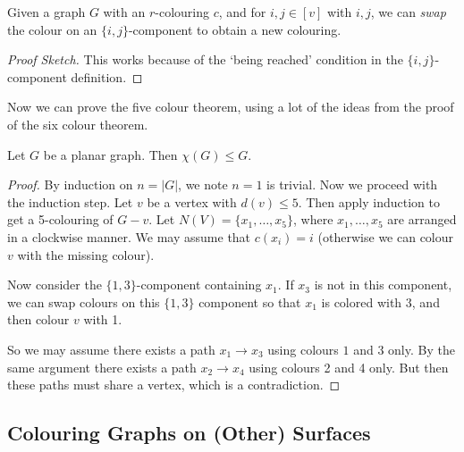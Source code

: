 \documentclass[a4paper]{scrartcl}
\begin{document}
\begin{proposition}
Given a graph $G$ with an $r$-colouring $c$, and for $i, j \in [v]$ with $i, j$, we can \emph{swap} the colour on an $\{i, j\}$-component to obtain a new colouring.	
\end{proposition}
\begin{proof}[Proof Sketch]
	This works because of the `being reached' condition in the $\{i, j\}$-component definition.
\end{proof}

Now we can prove the five colour theorem, using a lot of the ideas from the proof of the six colour theorem.

\begin{theorem}
	Let $G$ be a planar graph. Then $\chi(G) \leq G$.
\end{theorem}
\begin{proof}
	By induction on $n = |G|$, we note $n = 1$ is trivial.
	Now we proceed with the induction step. Let $v$ be a vertex with $d(v) \leq 5$. Then apply induction to get a 5-colouring of $G - v$. Let $N(V) = \{x_1, \dots, x_5\}$, where $x_1, \dots, x_5$ are arranged in a clockwise manner. We may assume that $c(x_i) = i$ (otherwise we can colour $v$ with the missing colour).

	Now consider the $\{1, 3\}$-component containing $x_1$. If $x_3$ is not in this component, we can swap colours on this $\{1, 3\}$ component so that $x_1$ is colored with $3$, and then colour $v$ with 1. 

	So we may assume there exists a path $x_1 \rightarrow x_3$ using colours $1$ and $3$ only. By the same argument there exists a path $x_2 \rightarrow x_4$ using colours 2 and 4 only. But then these paths must share a vertex, which is a contradiction.
\end{proof}

\subsection{Colouring Graphs on (Other) Surfaces}
\end{document}
